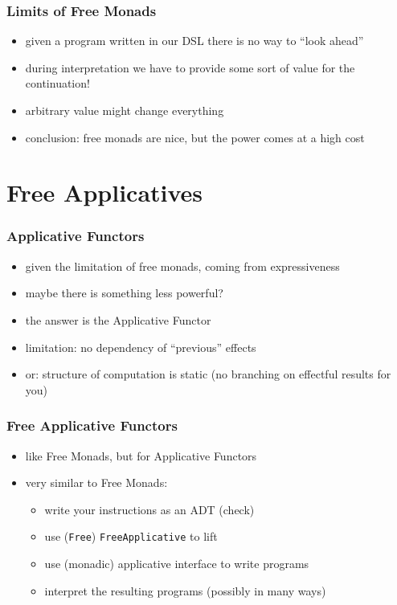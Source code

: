 \documentclass[compress]{beamer}
\begin{document}
\begin{frame}
  \frametitle{Limits of Free Monads}
  \begin{itemize}
  \item given a program written in our DSL there is no way to ``look
    ahead''
  \item during interpretation we have to provide some sort of value
    for the continuation!
  \item arbitrary value might change everything
  \item conclusion: free monads are nice, but the power comes at a
    high cost
  \end{itemize}
\end{frame}

\section{Free Applicatives}
\label{sec:free-applicatives}

\begin{frame}
  \frametitle{Applicative Functors}
  \begin{itemize}
  \item given the limitation of free monads, coming from
    expressiveness
  \item maybe there is something less powerful?
  \item the answer is the Applicative Functor
  \item limitation: no dependency of ``previous'' effects
  \item or: structure of computation is static (no branching on
    effectful results for you)
  \end{itemize}
\end{frame}

\begin{frame}
  \frametitle{Free Applicative Functors}
  \begin{itemize}
  \item like Free Monads, but for Applicative Functors
  \item very similar to Free Monads:
    \begin{itemize}
    \item write your instructions as an ADT (check)
    \item use (\texttt{Free}) \texttt{FreeApplicative} to lift
    \item use (monadic) applicative interface to write programs
    \item interpret the resulting programs (possibly in many ways)
    \end{itemize}
  \end{itemize}
\end{frame}
\end{document}
